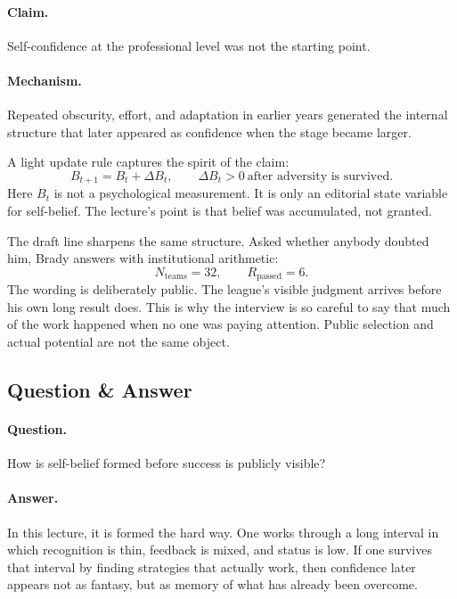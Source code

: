 \paragraph{Claim.} Self-confidence at the professional level was not the starting point.

\paragraph{Mechanism.} Repeated obscurity, effort, and adaptation in earlier years generated the internal structure that later appeared as confidence when the stage became larger.

A light update rule captures the spirit of the claim:
\begin{equation}
B_{t+1} = B_t + \Delta B_t,
\qquad
\Delta B_t > 0 \ \text{after adversity is survived}.
\end{equation}
Here \(B_t\) is not a psychological measurement. It is only an editorial state variable for self-belief. The lecture's point is that belief was accumulated, not granted.

The draft line sharpens the same structure. Asked whether anybody doubted him, Brady answers with institutional arithmetic:
\begin{equation}
N_{\text{teams}} = 32,
\qquad
R_{\text{passed}} = 6.
\end{equation}
The wording is deliberately public. The league's visible judgment arrives before his own long result does. This is why the interview is so careful to say that much of the work happened when no one was paying attention. Public selection and actual potential are not the same object.

\subsection{Question \& Answer}

\paragraph{Question.} How is self-belief formed before success is publicly visible?

\paragraph{Answer.} In this lecture, it is formed the hard way. One works through a long interval in which recognition is thin, feedback is mixed, and status is low. If one survives that interval by finding strategies that actually work, then confidence later appears not as fantasy, but as memory of what has already been overcome.


